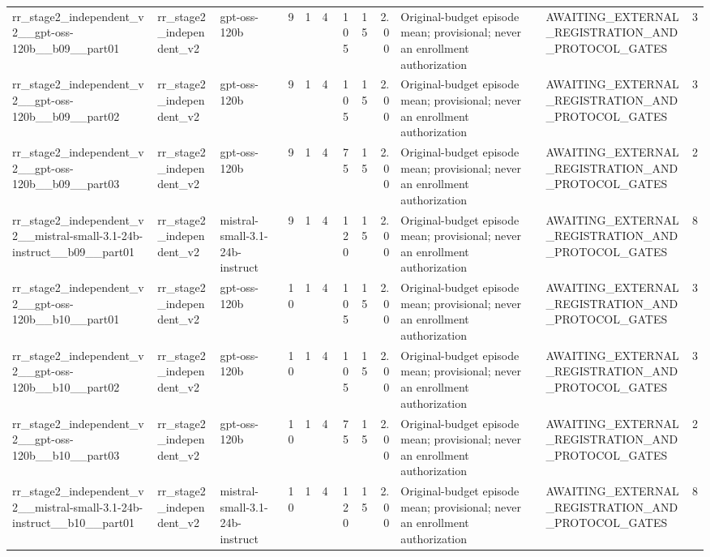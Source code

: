 \begin{tabular}{lllrrrrrrllr}
rr\_stage2\_independent\_v2\_\_gpt-oss-120b\_\_b09\_\_part01 & rr\_stage2\_independent\_v2 & gpt-oss-120b & 9 & 1 & 4 & 105 & 15 & 2.00 & Original-budget episode mean; provisional; never an enrollment authorization & AWAITING\_EXTERNAL\_REGISTRATION\_AND\_PROTOCOL\_GATES & 3 \\
rr\_stage2\_independent\_v2\_\_gpt-oss-120b\_\_b09\_\_part02 & rr\_stage2\_independent\_v2 & gpt-oss-120b & 9 & 1 & 4 & 105 & 15 & 2.00 & Original-budget episode mean; provisional; never an enrollment authorization & AWAITING\_EXTERNAL\_REGISTRATION\_AND\_PROTOCOL\_GATES & 3 \\
rr\_stage2\_independent\_v2\_\_gpt-oss-120b\_\_b09\_\_part03 & rr\_stage2\_independent\_v2 & gpt-oss-120b & 9 & 1 & 4 & 75 & 15 & 2.00 & Original-budget episode mean; provisional; never an enrollment authorization & AWAITING\_EXTERNAL\_REGISTRATION\_AND\_PROTOCOL\_GATES & 2 \\
rr\_stage2\_independent\_v2\_\_mistral-small-3.1-24b-instruct\_\_b09\_\_part01 & rr\_stage2\_independent\_v2 & mistral-small-3.1-24b-instruct & 9 & 1 & 4 & 120 & 15 & 2.00 & Original-budget episode mean; provisional; never an enrollment authorization & AWAITING\_EXTERNAL\_REGISTRATION\_AND\_PROTOCOL\_GATES & 8 \\
rr\_stage2\_independent\_v2\_\_gpt-oss-120b\_\_b10\_\_part01 & rr\_stage2\_independent\_v2 & gpt-oss-120b & 10 & 1 & 4 & 105 & 15 & 2.00 & Original-budget episode mean; provisional; never an enrollment authorization & AWAITING\_EXTERNAL\_REGISTRATION\_AND\_PROTOCOL\_GATES & 3 \\
rr\_stage2\_independent\_v2\_\_gpt-oss-120b\_\_b10\_\_part02 & rr\_stage2\_independent\_v2 & gpt-oss-120b & 10 & 1 & 4 & 105 & 15 & 2.00 & Original-budget episode mean; provisional; never an enrollment authorization & AWAITING\_EXTERNAL\_REGISTRATION\_AND\_PROTOCOL\_GATES & 3 \\
rr\_stage2\_independent\_v2\_\_gpt-oss-120b\_\_b10\_\_part03 & rr\_stage2\_independent\_v2 & gpt-oss-120b & 10 & 1 & 4 & 75 & 15 & 2.00 & Original-budget episode mean; provisional; never an enrollment authorization & AWAITING\_EXTERNAL\_REGISTRATION\_AND\_PROTOCOL\_GATES & 2 \\
rr\_stage2\_independent\_v2\_\_mistral-small-3.1-24b-instruct\_\_b10\_\_part01 & rr\_stage2\_independent\_v2 & mistral-small-3.1-24b-instruct & 10 & 1 & 4 & 120 & 15 & 2.00 & Original-budget episode mean; provisional; never an enrollment authorization & AWAITING\_EXTERNAL\_REGISTRATION\_AND\_PROTOCOL\_GATES & 8 \\

\end{tabular}
